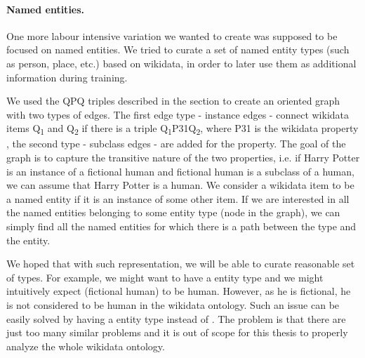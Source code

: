 \paragraph{Named entities.}

One more labour intensive variation we wanted to create was supposed to be focused on named entities. We tried to curate a set of named entity types (such as person, place, etc.) based on wikidata, in order to later use them as additional information during training. 

We used the QPQ triples described in the  section to create an oriented graph with two types of edges. The first edge type - instance edges - connect wikidata items Q\textsubscript{1} and Q\textsubscript{2} if there is a triple Q\textsubscript{1}P31Q\textsubscript{2}, where P31 is the wikidata property , the second type - subclass edges - are added for the  property. The goal of the graph is to capture the transitive nature of the two properties, i.e. if Harry Potter is an instance of a fictional human and fictional human is a subclass of a human, we can assume that Harry Potter is a human. We consider a wikidata item to be a named entity if it is an instance of some other item. If we are interested in all the named entities belonging to some entity type (node in the graph), we can simply find all the named entities for which there is a path between the type and the entity.

We hoped that with such representation, we will be able to curate reasonable set of types. For example, we might want to have a  entity type and we might intuitively expect  (fictional human) to be human. However, as he is fictional, he is not considered to be human in the wikidata ontology. Such an issue can be easily solved by having a  entity type instead of . The problem is that there are just too many similar problems and it is out of scope for this thesis to properly analyze the whole wikidata ontology. 


